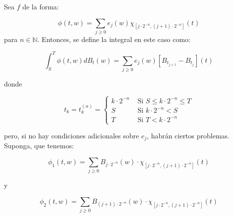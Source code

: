 Sea $f$ de la forma:

\[
	\phi (t, w) = \sum_{j \geq 0} e_j (w) \chi_{ [j \cdot 2^{-n}, (j+1)\cdot 2^{-n}  ] }(t)
\]
para $n \in \mathbb{N}$. Entonces, se define la integral en este caso como:

\[
	\int_S^T \phi(t,w) dB_t(w) = \sum_{j \geq 0} e_j (w) [B_{t_{j+1}} - B_{t_j}] (t)
\]

donde

\[
	t_k = t_k^{(n)} = \left\{  \begin{array}{lr}
		k \cdot 2^{-n} & \text{ Si } S \leq k \cdot 2^{-n} \leq T \\
		S & \text{ Si } k \cdot 2^{-n} < S \\
		T & \text{ Si } T < k \cdot 2^{-n}
	\end{array} \right.
\]

pero, si no hay condiciones adicionales sobre $e_j$, habrán ciertos problemas. Suponga, que tenemos:

\[
	\phi_1(t,w)  = \sum_{j \geq 0} B_{j \cdot 2^{-n} } (w) \cdot \chi_{ [j \cdot 2^{-n}, (j+1) \cdot 2^{-n} ]  } (t)
\]

y

\[
	\phi_2(t,w)  = \sum_{j \geq 0} B_{(j+1) \cdot 2^{-n} } (w) \cdot \chi_{ [j \cdot 2^{-n}, (j+1) \cdot 2^{-n} ]  } (t)
\]